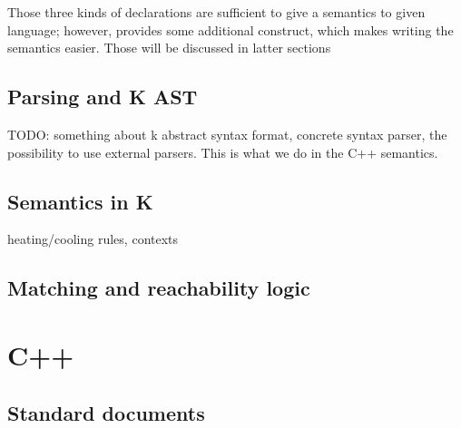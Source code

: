 \documentclass{fithesis3}
\begin{document}



Those three kinds of \K declarations are sufficient to give a semantics to given language; however, \K provides some additional construct, which makes writing the semantics easier. Those will be discussed in latter sections


\subsection{Parsing and K AST}
TODO: something about k abstract syntax format, concrete syntax parser, the possibility to use external parsers. This is what we do in the C++ semantics.

\subsection{Semantics in K}

heating/cooling rules, contexts

\subsection{Matching and reachability logic}


\section{C++}



\subsection{Standard documents}
\end{document}
